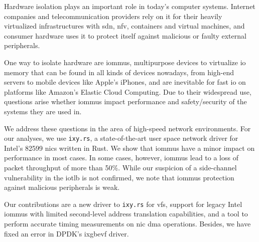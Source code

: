 \small

Hardware isolation plays an important role in today's computer systems.
Internet companies and telecommunication providers rely on it for their heavily
virtualized infrastructures with \ac{sdn}, \ac{nfv}, containers and virtual
machines, and consumer hardware uses it to protect itself against malicious or
faulty external peripherals.

One way to isolate hardware are \acp{iommu}, multipurpose devices to virtualize
\acs{io} memory that can be found in all kinds of devices nowadays, from
high-end servers to mobile devices like Apple's iPhones, and are inevitable for
fast \ac{io} on platforms like Amazon's Elastic Cloud Computing. Due to their
widespread use, questions arise whether \acp{iommu} impact performance and
safety/security of the systems they are used in.

We address these questions in the area of high-speed network environments. For
our analyses, we use \texttt{ixy.rs}, a state-of-the-art user space network
driver for Intel's 82599 \acp{nic} written in Rust. We show that \acp{iommu}
have a minor impact on performance in most cases. In some cases, however,
\acp{iommu} lead to a loss of packet throughput of more than 50\%. While our
suspicion of a side-channel vulnerability in the \acs{iotlb} is not confirmed,
we note that \acp{iommu} protection against malicious peripherals is weak.

Our contributions are a new driver to \texttt{ixy.rs} for \acp{vf}, support for
legacy Intel \acp{iommu} with limited second-level address translation
capabilities, and a tool to perform accurate timing measurements on \ac{nic}
\acs{dma} operations. Besides, we have fixed an error in DPDK's ixgbevf driver.

